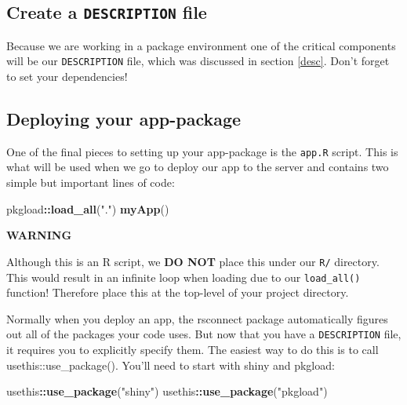\documentclass[
]{book}
\newenvironment{Shaded}{\begin{snugshade}}{\end{snugshade}}
\newcommand{\KeywordTok}[1]{\textcolor[rgb]{0.13,0.29,0.53}{\textbf{#1}}}
\newcommand{\NormalTok}[1]{#1}
\newcommand{\OperatorTok}[1]{\textcolor[rgb]{0.81,0.36,0.00}{\textbf{#1}}}
\newcommand{\StringTok}[1]{\textcolor[rgb]{0.31,0.60,0.02}{#1}}
\begin{document}
\hypertarget{create-a-description-file}{%
\subsection{\texorpdfstring{Create a \texttt{DESCRIPTION} file}{Create a DESCRIPTION file}}\label{create-a-description-file}}

Because we are working in a package environment one of the critical components will be our \texttt{DESCRIPTION} file, which was discussed in section \ref{desc}. Don't forget to set your dependencies!

\hypertarget{deploying-your-app-package}{%
\subsection{Deploying your app-package}\label{deploying-your-app-package}}

One of the final pieces to setting up your app-package is the \texttt{app.R} script. This is what will be used when we go to deploy our app to the server and contains two simple but important lines of code:

\begin{Shaded}
\begin{Highlighting}[]
\NormalTok{pkgload}\OperatorTok{::}\KeywordTok{load_all}\NormalTok{(}\StringTok{"."}\NormalTok{)}
\KeywordTok{myApp}\NormalTok{()}
\end{Highlighting}
\end{Shaded}

\textbf{WARNING}

Although this is an R script, we \textbf{DO NOT} place this under our \texttt{R/} directory. This would result in an infinite loop when loading due to our \texttt{load\_all()} function! Therefore place this at the top-level of your project directory.

Normally when you deploy an app, the rsconnect package automatically figures out all of the packages your code uses. But now that you have a \texttt{DESCRIPTION} file, it requires you to explicitly specify them. The easiest way to do this is to call usethis::use\_package(). You'll need to start with shiny and pkgload:

\begin{Shaded}
\begin{Highlighting}[]
\NormalTok{usethis}\OperatorTok{::}\KeywordTok{use_package}\NormalTok{(}\StringTok{"shiny"}\NormalTok{)}
\NormalTok{usethis}\OperatorTok{::}\KeywordTok{use_package}\NormalTok{(}\StringTok{"pkgload"}\NormalTok{)}
\end{Highlighting}
\end{Shaded}
\end{document}
